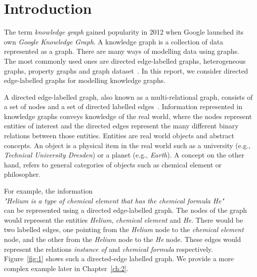 \chapter{Introduction}
\label{ch:1}
The term \textit{knowledge graph} gained popularity in 2012 when Google launched its own \textit{Google Knowledge Graph}. A knowledge graph is a collection of data represented as a graph. There are many ways of modelling data using graphs. The most commonly used ones are directed edge-labelled graphs, heterogeneous graphs, property graphs and graph dataset~\cite{Hogan2021}. In this report, we consider directed edge-labelled graphs for modelling knowledge graphs.

A directed edge-labelled graph, also known as a multi-relational graph, consists of a set of nodes and a set of directed labelled edges~\cite{Hogan2021}. Information represented in knowledge graphs conveys knowledge of the real world, where the nodes represent entities of interest and the directed edges represent the many different binary relations between those entities. Entities are real world objects and abstract concepts. An object is a physical item in the real world such as a university (e.g., \textit{Technical University Dresden}) or a planet (e.g., \textit{Earth}). A concept on the other hand, refers to general categories of objects such as chemical element or philosopher. 

For example, the information \\
\hspace*{0.25cm} \textit{"Helium is a type of chemical element that has the chemical formula He"} \\
can be represented using a directed edge-labelled graph. The nodes of the graph would represent the entities \textit{Helium}, \textit{chemical element} and \textit{He}. There would be two labelled edges, one pointing from the \textit{Helium} node to the \textit{chemical element} node, and the other from the \textit{Helium} node to the \textit{He} node. These edges would represent the relations \textit{instance of} and \textit{chemical formula} respectively. Figure~\ref{fig:1} shows such a directed-edge labelled graph. We provide a more complex example later in Chapter~\ref{ch:2}.

